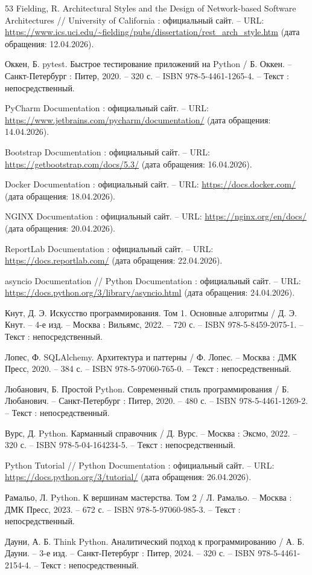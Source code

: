 \begin{thebibliography}{53}
	Fielding, R. Architectural Styles and the Design of Network-based Software Architectures // University of California : официальный сайт. – URL: \url{https://www.ics.uci.edu/~fielding/pubs/dissertation/rest_arch_style.htm} (дата обращения: 12.04.2026).
	
	Оккен, Б. pytest. Быстрое тестирование приложений на Python / Б. Оккен. – Санкт-Петербург : Питер, 2020. – 320 с. – ISBN 978-5-4461-1265-4. – Текст : непосредственный.
	
	PyCharm Documentation : официальный сайт. – URL: \url{https://www.jetbrains.com/pycharm/documentation/} (дата обращения: 14.04.2026).
	
	Bootstrap Documentation : официальный сайт. – URL: \url{https://getbootstrap.com/docs/5.3/} (дата обращения: 16.04.2026).
	
	Docker Documentation : официальный сайт. – URL: \url{https://docs.docker.com/} (дата обращения: 18.04.2026).
	
	NGINX Documentation : официальный сайт. – URL: \url{https://nginx.org/en/docs/} (дата обращения: 20.04.2026).
	
	ReportLab Documentation : официальный сайт. – URL: \url{https://docs.reportlab.com/} (дата обращения: 22.04.2026).
	
	asyncio Documentation // Python Documentation : официальный сайт. – URL: \url{https://docs.python.org/3/library/asyncio.html} (дата обращения: 24.04.2026).
	
	Кнут, Д. Э. Искусство программирования. Том 1. Основные алгоритмы / Д. Э. Кнут. – 4-е изд. – Москва : Вильямс, 2022. – 720 с. – ISBN 978-5-8459-2075-1. – Текст : непосредственный.
	
	Лопес, Ф. SQLAlchemy. Архитектура и паттерны / Ф. Лопес. – Москва : ДМК Пресс, 2020. – 384 с. – ISBN 978-5-97060-765-0. – Текст : непосредственный.
	
	Любанович, Б. Простой Python. Современный стиль программирования / Б. Любанович. – Санкт-Петербург : Питер, 2020. – 480 с. – ISBN 978-5-4461-1269-2. – Текст : непосредственный.
	
	Вурс, Д. Python. Карманный справочник / Д. Вурс. – Москва : Эксмо, 2022. – 320 с. – ISBN 978-5-04-164234-5. – Текст : непосредственный.
	
	Python Tutorial // Python Documentation : официальный сайт. – URL: \url{https://docs.python.org/3/tutorial/} (дата обращения: 26.04.2026).
	
	Рамальо, Л. Python. К вершинам мастерства. Том 2 / Л. Рамальо. – Москва : ДМК Пресс, 2023. – 672 с. – ISBN 978-5-97060-985-3. – Текст : непосредственный.
	
	Дауни, А. Б. Think Python. Аналитический подход к программированию / А. Б. Дауни. – 3-е изд. – Санкт-Петербург : Питер, 2024. – 320 с. – ISBN 978-5-4461-2154-4. – Текст : непосредственный.
	
\end{thebibliography}